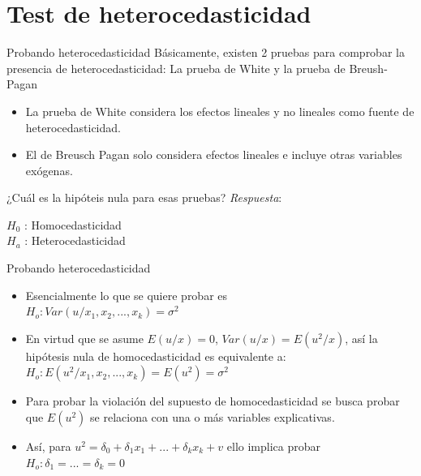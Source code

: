 \section[Test]{Test de heterocedasticidad}

\begin{frame}{Probando heterocedasticidad}
	Básicamente, existen 2 pruebas para comprobar la presencia de heterocedasticidad: La prueba de White y la prueba de Breush-Pagan
		\begin{itemize}
			\item La prueba de White considera los efectos lineales y no lineales como fuente de heterocedasticidad.
			\item El de Breusch Pagan solo considera efectos lineales e incluye otras variables exógenas.
		\end{itemize}
	¿Cuál es la hipóteis nula para esas pruebas? \textit{Respuesta}:
		\begin{center}
			$H_0$ : Homocedasticidad\\
			$H_a$ : Heterocedasticidad
		\end{center}
\end{frame}
\begin{frame}{Probando heterocedasticidad}
	\begin{itemize}
		\item Esencialmente lo que se quiere probar es \\
				$H_{o}:Var(u/x_{1},x_{2},...,x_{k})=\sigma^2$
		\pause
		\item En virtud que se asume $E(u/x)=0$, $Var(u/x)=E(u^2/x)$, así la hipótesis nula de homocedasticidad es equivalente a:\\
		$H_{o}:E(u^{2}/x_{1},x_{2},...,x_{k})=E(u^{2})=\sigma^2$
		\pause
		\item Para probar la violación del supuesto de homocedasticidad se busca probar que $E(u^{2})$ se relaciona con una o más variables explicativas.
		\pause
		\item Así, para $u^{2}=\delta_{0}+\delta_{1}x_{1}+...+\delta_{k}x_{k}+v$ ello implica probar $H_{o}:\delta_{1}=...=\delta_{k}=0$
	\end{itemize}
\end{frame}

